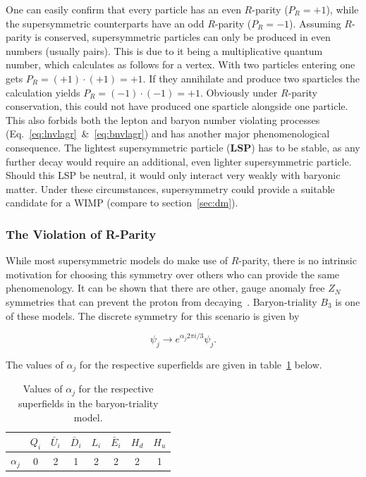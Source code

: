 \noindent One can easily confirm that every particle has an even $R$-parity ($P_R = +1$), while the supersymmetric counterparts have an odd $R$-parity ($P_R = -1$). Assuming $R$-parity is conserved, supersymmetric particles can only be produced in even numbers (usually pairs). This is due to it being a multiplicative quantum number, which calculates as follows for a vertex. With two particles entering one gets $P_R = (+1) \cdot (+1) = +1$. If they annihilate and produce two sparticles the calculation yields $P_R = (-1) \cdot (-1) = +1$. Obviously under $R$-parity conservation, this could not have produced one sparticle alongside one particle. This also forbids both the lepton and baryon number violating processes (Eq.~\ref{eq:lnvlagr}~\&~\ref{eq:bnvlagr}) and has another major phenomenological consequence. The lightest supersymmetric particle (\textbf{LSP}) has to be stable, as any further decay would require an additional, even lighter supersymmetric particle. Should this LSP be neutral, it would only interact very weakly with baryonic matter. Under these circumstances, supersymmetry could provide a suitable candidate for a WIMP (compare to section~\ref{sec:dm}).



\subsubsection{The Violation of R-Parity}
\label{sec:rparityvio}

While most supersymmetric models do make use of $R$-parity, there is no intrinsic motivation for choosing this symmetry over others who can provide the same phenomenology. It can be shown that there are other, gauge anomaly free $Z_N$ symmetries that can prevent the proton from decaying~\cite{b3p6}. Baryon-triality $B_3$ is one of these models. The discrete symmetry for this scenario is given by~\cite{b3def}

\begin{equation}
  \label{eq:b3symmetry}
  \psi_j \rightarrow e^{\alpha_j 2\pi i/3} \psi_j.
\end{equation}

\noindent The values of $\alpha_j$ for the respective superfields are given in table~\ref{tab:alphaj} below.

\begin{table}[htb]
  \centering
  \begin{tabular}{|c|c|c|c|c|c|c|c|}
    \hline
    & $Q_i$ & $\bar{U}_i$ & $\bar{D}_i$ & $L_i$ & $\bar{E}_i$ & $H_d$ & $H_u$ \\ \hline
    $\alpha_j$ & 0 & 2 & 1 & 2 & 2 & 2 & 1 \\ \hline
  \end{tabular}
  \caption{Values of $\alpha_j$ for the respective superfields in the baryon-triality model.}
  \label{tab:alphaj}
\end{table}

